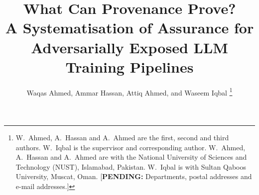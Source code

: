 \documentclass[journal,10pt]{IEEEtran}
\theoremstyle{definition}
\newcommand{\pending}[1]{{\color{red!70!black}[\textbf{PENDING:} #1]}}
\begin{document}
\title{What Can Provenance Prove?\\ A Systematisation of Assurance for\\ Adversarially Exposed LLM Training Pipelines}
\author{Waqas Ahmed, Ammar Hassan, Attiq Ahmed, and Waseem Iqbal%
\thanks{W.~Ahmed, A.~Hassan and A.~Ahmed are the first, second and third authors. W.~Iqbal is the supervisor and corresponding author. W.~Ahmed, A.~Hassan and A.~Ahmed are with the National University of Sciences and Technology (NUST), Islamabad, Pakistan. W.~Iqbal is with Sultan Qaboos University, Muscat, Oman. \pending{Departments, postal addresses and e-mail addresses.}}}
\maketitle
\end{document}
